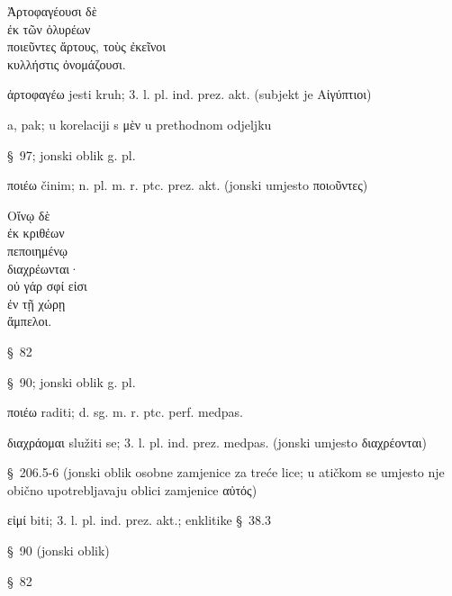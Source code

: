 
{\large
\begin{greek}
\noindent Ἀρτοφαγέουσι δὲ \\
\tabto{2em} ἐκ τῶν ὀλυρέων \\
\tabto{4em} ποιεῦντες ἄρτους,
\tabto{6em} τοὺς ἐκεῖνοι \\
\tabto{6em} κυλλήστις ὀνομάζουσι.\\

\end{greek}
}

\begin{description}[noitemsep]
\item[Ἀρτοφαγέουσι] ἀρτοφαγέω jesti kruh; 3. l. pl. ind. prez. akt. (subjekt je \textgreek[variant=ancient]{Αἰγύπτιοι)}
\item[δὲ] a, pak; u korelaciji s μὲν u prethodnom odjeljku
\item[ἐκ τῶν ὀλυρέων] §~97; jonski oblik g. pl.
\item[ποιεῦντες] ποιέω činim; n. pl. m. r. ptc. prez. akt. (jonski umjesto \textgreek[variant=ancient]{ποιoῦντες)}

\end{description}


{\large
\begin{greek}
\noindent Οἴνῳ δὲ \\
\tabto{2em} ἐκ κριθέων \\
πεποιημένῳ \\
διαχρέωνται·\\
οὐ γάρ σφί εἰσι \\
\tabto{2em} ἐν τῇ χώρῃ \\
ἄμπελοι.\\

\end{greek}
}

\begin{description}[noitemsep]
\item[Οἴνῳ] §~82
\item[ἐκ κριθέων] §~90; jonski oblik g. pl.
\item[πεποιημένῳ] ποιέω raditi; d. sg. m. r. ptc. perf. medpas.
\item[διαχρέωνται] διαχράομαι služiti se; 3. l. pl. ind. prez. medpas. (jonski umjesto \textgreek[variant=ancient]{διαχρέονται)}
\item[σφί] §~206.5-6 (jonski oblik osobne zamjenice za treće lice; u atičkom se umjesto nje obično upotrebljavaju oblici zamjenice αὐτός)
\item[εἰσι] εἰμί biti; 3. l. pl. ind. prez. akt.; enklitike §~38.3 
\item[ἐν τῇ χώρῃ] §~90 (jonski oblik)
\item[ἄμπελοι] §~82

\end{description}


